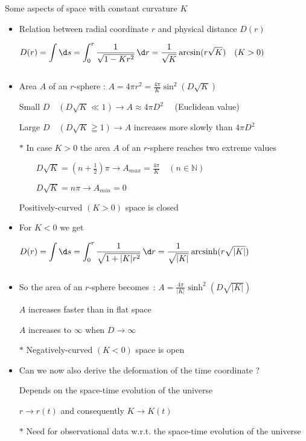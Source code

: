 \Tr
\begin{center}
{\red Some aspects of space with constant curvature $K$}
\end{center}
%
\begin{itemize}
\item Relation between {\blue radial coordinate $r$} and {\blue physical distance $D(r)$}
\item[] $\displaystyle D(r)=\int \d s=\int_{0}^{r} \frac{1}{\sqrt{1-Kr^{2}}}\,\d r
         =\frac{1}{\sqrt{K}} \arcsin(r\sqrt{K}) \quad (K>0)$
\item[] {\red {}} $\qquad$
        {\red {}}
\item Area $A$ of an $r$-sphere : $\displaystyle A=4\pi r^{2}=\frac{4\pi}{K}\sin^{2}(D\sqrt{K})$
\item[] Small $D \quad (D\sqrt{K} \ll 1) \rightarrow A \approx 4\pi D^{2} \quad$ (Euclidean value)
\item[] Large $D \quad (D\sqrt{K} \geqq 1) \rightarrow A$ increases more slowly than $4\pi D^{2}$
\item[$\ast$] {\blue In case $K>0$ the area $A$ of an $r$-sphere reaches two extreme values}
\item[] {\blue $\qquad D\sqrt{K}=(n+\frac{1}{2})\pi \rightarrow  A_{max}=\frac{4\pi}{K} \quad (n \in \mathbb{N})$}
\item[] {\blue $\qquad D\sqrt{K}=n\pi \rightarrow A_{min}=0$}
\item[] {\red Positively-curved $(K>0)$ space is closed}
\end{itemize}

\Tr
\begin{itemize}
\item For $K<0$ we get
\item[] $\displaystyle D(r)=\int \d s=\int_{0}^{r} \frac{1}{\sqrt{1+|K|r^{2}}}\,\d r
         =\frac{1}{\sqrt{|K|}} {\rm \,arcsinh}(r\sqrt{|K|})$
\item[] {\red {}} $\qquad$
        {\red {}}
\item So the area of an $r$-sphere becomes~: $\displaystyle A=\frac{4\pi}{|K|}\sinh^{2}(D\sqrt{|K|})$
\item[] $A$ increases faster than in flat space
\item[] $A$ increases to $\infty$ when $D \rightarrow \infty$
\item[$\ast$] {\red Negatively-curved $(K<0)$ space is open}
\item {\blue Can we now also derive the deformation of the time coordinate ?}
\item[] Depends on the space-time evolution of the universe
\item[] $r \rightarrow r(t)$ and consequently $K \rightarrow K(t)$
\item[$\ast$] Need for observational data w.r.t. the space-time evolution of the universe
\end{itemize}
